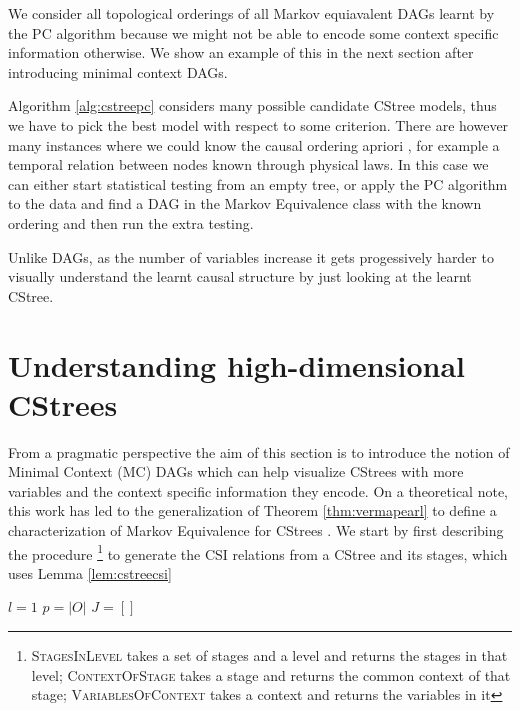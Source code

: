 \documentclass{tufte-book}
\begin{document}
\begin{Definition}
We consider all topological orderings of all Markov equiavalent DAGs learnt by the PC algorithm because we might not be able to encode some context specific information otherwise. We show an example of this in the next section after introducing minimal context DAGs.

Algorithm \ref{alg:cstreepc} considers many possible candidate CStree models, thus we have to pick the best model with respect to some criterion. There are however many instances where we could know the causal ordering apriori \cite{thwaites-2010-causal-analy,silander-2013}, for example a temporal relation between nodes known through physical laws. In this case we can either start statistical testing from an empty tree, or apply the PC algorithm to the data and find a DAG in the Markov Equivalence class with the known ordering and then run the extra testing.



Unlike DAGs, as the number of variables increase it gets progessively harder to visually understand the learnt causal structure by just looking at the learnt CStree.






\section{Understanding high-dimensional CStrees}
\label{sec:orga71e837}
From a pragmatic perspective the aim of this section is to introduce the notion of Minimal Context (MC) DAGs which can help visualize CStrees with more variables and the context specific information they encode. On a theoretical note, this work has led to
  the generalization of Theorem \ref{thm:vermapearl} to define a characterization of Markov Equivalence for CStrees \cite{duarte-2021-repres-learn}. We start by first describing the procedure  \footnote{\textsc{StagesInLevel} takes a set of stages and a level and returns the stages in that level; \textsc{ContextOfStage} takes a stage and returns the common context of that stage; \textsc{VariablesOfContext} takes a context and returns the variables in it}  to generate the CSI relations from a CStree and its stages, which uses Lemma \ref{lem:cstreecsi}

   \begin{algorithm}\label{alg:gencsirels}
  \SetAlgoLined
  $l=1$\;
  $p=|O|$\;
  $J = []$\;
  

\end{algorithm}
\end{Definition}
\end{document}
